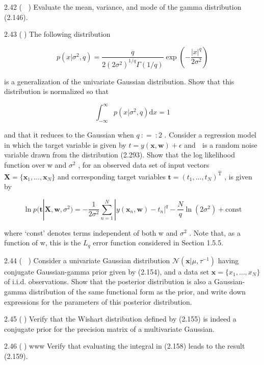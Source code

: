 \documentclass[
  10
]{article}
\begin{document}
2.42 ( ) Evaluate the mean, variance, and mode of the gamma distribution
(2.146).

2.43 () The following distribution

\[
p (x | \sigma^ {2}, q) = \frac {q}{2 (2 \sigma^ {2}) ^ {1 / q} \Gamma (1 / q)} \exp \left(- \frac {| x | ^ {q}}{2 \sigma^ {2}}\right)\tag{2.293}
\]

is a generalization of the univariate Gaussian distribution. Show that
this distribution is normalized so that

\[
\int_ {- \infty} ^ {\infty} p (x | \sigma^ {2}, q) \mathrm{d} x = 1\tag{2.294}
\]

and that it reduces to the Gaussian when \(q \ : = \ : 2\) . Consider a
regression model in which the target variable is given by
\(t = y ( \mathbf { x } , \mathbf { w } ) + \epsilon\) and  is a random
noise variable drawn from the distribution (2.293). Show that the log
likelihood function over w and \(\sigma ^ { 2 }\) , for an observed data
set of input vectors
\(\mathbf { X } = \{ \mathbf { x } _ { 1 } , \ldots , \mathbf { x } _ { N } \}\)
and corresponding target variables
\(\mathbf { t } = ( t _ { 1 } , \ldots , t _ { N } ) ^ { \mathrm { \hat { T } } }\)
, is given by

\[
\ln p (\mathbf {t} | \mathbf {X}, \mathbf {w}, \sigma^ {2}) = - \frac {1}{2 \sigma^ {2}} \sum_ {n = 1} ^ {N} | y (\mathbf {x} _ {n}, \mathbf {w}) - t _ {n} | ^ {q} - \frac {N}{q} \ln (2 \sigma^ {2}) + \mathrm{const}\tag{2.295}
\]

where `const' denotes terms independent of both w and \(\sigma ^ { 2 }\)
. Note that, as a function of w, this is the \(L _ { q }\) error
function considered in Section 1.5.5.

2.44 ( ) Consider a univariate Gaussian distribution
\(\mathcal { N } ( \boldsymbol { x } | \mu , \tau ^ { - 1 } )\) having
conjugate Gaussian-gamma prior given by (2.154), and a data set
\(\mathbf { x } = \{ x _ { 1 } , \ldots , x _ { N } \}\) of i.i.d.
observations. Show that the posterior distribution is also a
Gaussian-gamma distribution of the same functional form as the prior,
and write down expressions for the parameters of this posterior
distribution.

2.45 () Verify that the Wishart distribution defined by (2.155) is
indeed a conjugate prior for the precision matrix of a multivariate
Gaussian.

2.46 () www Verify that evaluating the integral in (2.158) leads to the
result (2.159).
\end{document}
